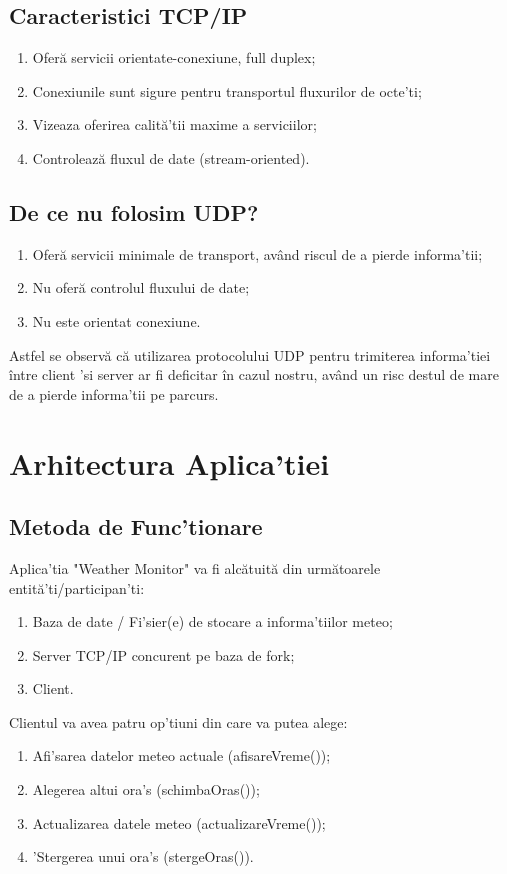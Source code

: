 \documentclass{llncs}
\begin{document}
\subsection{Caracteristici TCP/IP}
%
\begin{enumerate}
%
\item Oferă servicii orientate-conexiune, full duplex;
\item Conexiunile sunt sigure pentru transportul fluxurilor de octe'ti;
\item Vizeaza oferirea calită'tii maxime a serviciilor;
\item Controlează fluxul de date (stream-oriented).
\end{enumerate}
%
\subsection{De ce nu folosim UDP?}
%
\begin{enumerate}
\item Oferă servicii minimale de transport, având riscul de a pierde informa'tii;
\item Nu oferă controlul fluxului de date;
\item Nu este orientat conexiune.
\end{enumerate}
%
Astfel se observă că utilizarea protocolului UDP pentru trimiterea informa'tiei între client 'si server ar fi deficitar în cazul nostru, având un risc destul de mare de a pierde informa'tii pe parcurs.
%
\section{Arhitectura Aplica'tiei}
%
\subsection{Metoda de Func'tionare}
%
Aplica'tia "Weather Monitor" va fi alcătuită din următoarele entită'ti/participan'ti:
%
\begin{enumerate}
\item Baza de date / Fi'sier(e) de stocare a informa'tiilor meteo;
\item Server TCP/IP concurent pe baza de fork;
\item Client.
\end{enumerate}
%
Clientul va avea patru op'tiuni din care va putea alege:
%
\begin{enumerate}
\item Afi'sarea datelor meteo actuale (afisareVreme());
\item Alegerea altui ora's (schimbaOras());
\item Actualizarea datele meteo (actualizareVreme());
\item 'Stergerea unui ora's (stergeOras()).
\end{enumerate}
%
\end{document}
